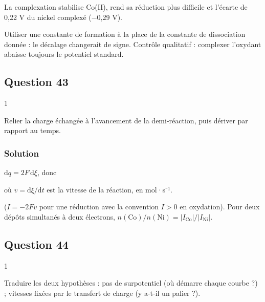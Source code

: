 \documentclass[11pt,a4paper]{article}
\newcommand{\equationajustee}[1]{%
  \sbox{\boiteequation}{$\displaystyle #1$}%
  \ifdim\wd\boiteequation>\linewidth
    \[\resizebox{\linewidth}{!}{\usebox{\boiteequation}}\]%
  \else
    \[#1\]%
  \fi}
\begin{document}
La complexation stabilise Co(II), rend sa réduction plus difficile et l'écarte de 0,22 V du nickel complexé (−0,29 V).

\begin{piege}

Utiliser une constante de formation à la place de la constante de dissociation donnée : le décalage changerait de signe. Contrôle qualitatif : complexer l'oxydant abaisse toujours le potentiel standard.

\end{piege}

\hypertarget{question-43}{%
\subsection{Question 43}\label{question-43}}

\begin{indication}{1}

Relier la charge échangée à l'avancement de la demi-réaction, puis dériver par rapport au temps.

\end{indication}

\hypertarget{solution-42}{%
\subsubsection{Solution}\label{solution-42}}

\(\mathrm dq=2F\,\mathrm d\xi\), donc

\equationajustee{\boxed{\lvert I\rvert=2\,F\,v}}

où \(v=\mathrm d\xi/\mathrm dt\) est la vitesse de la réaction, en mol·s⁻¹.

(\(I=-2Fv\) pour une réduction avec la convention \(I>0\) en oxydation). Pour deux dépôts simultanés à deux électrons, \(n(\mathrm{Co})/n(\mathrm{Ni})=\lvert I_{\mathrm{Co}}\rvert/\lvert I_{\mathrm{Ni}}\rvert\).

\hypertarget{question-44}{%
\subsection{Question 44}\label{question-44}}

\begin{indication}{1}

Traduire les deux hypothèses : pas de surpotentiel (où démarre chaque courbe ?) ; vitesses fixées par le transfert de charge (y a-t-il un palier ?).

\end{indication}
\end{document}
